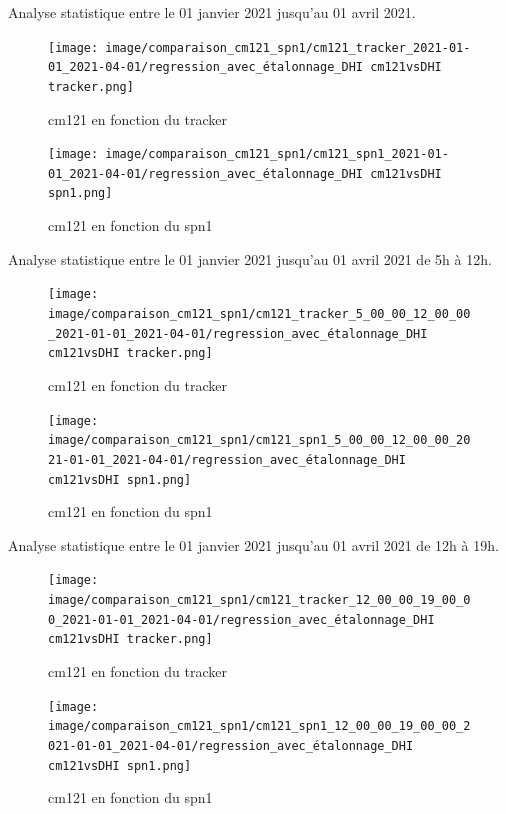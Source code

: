 \documentclass[12pt,a4paper]{article}
\begin{document}
\begin{flushleft}
Analyse statistique entre le 01 janvier 2021 jusqu'au 01 avril 2021.

\begin{figure}[H]
\centering
\texttt{[image: image/comparaison\_cm121\_spn1/cm121\_tracker\_2021-01-01\_2021-04-01/regression\_avec\_étalonnage\_DHI cm121vsDHI tracker.png]} 
\caption{cm121 en fonction du tracker}    
\end{figure}

\begin{figure}[H]
\centering
\texttt{[image: image/comparaison\_cm121\_spn1/cm121\_spn1\_2021-01-01\_2021-04-01/regression\_avec\_étalonnage\_DHI cm121vsDHI spn1.png]}  
\caption{cm121 en fonction du spn1} 
\end{figure}


Analyse statistique entre le 01 janvier 2021 jusqu'au 01 avril 2021 de 5h à 12h.

\begin{figure}[H]
\centering
\texttt{[image: image/comparaison\_cm121\_spn1/cm121\_tracker\_5\_00\_00\_12\_00\_00\_2021-01-01\_2021-04-01/regression\_avec\_étalonnage\_DHI cm121vsDHI tracker.png]}  
\caption{cm121 en fonction du tracker}
\end{figure}

\begin{figure}[H]
\centering
\texttt{[image: image/comparaison\_cm121\_spn1/cm121\_spn1\_5\_00\_00\_12\_00\_00\_2021-01-01\_2021-04-01/regression\_avec\_étalonnage\_DHI cm121vsDHI spn1.png]}  
\caption{cm121 en fonction du spn1}  
\end{figure}



Analyse statistique entre le 01 janvier 2021 jusqu'au 01 avril 2021 de 12h à 19h.


\begin{figure}[H]
\centering
\texttt{[image: image/comparaison\_cm121\_spn1/cm121\_tracker\_12\_00\_00\_19\_00\_00\_2021-01-01\_2021-04-01/regression\_avec\_étalonnage\_DHI cm121vsDHI tracker.png]} 
\caption{cm121 en fonction du tracker}    
\end{figure}

\begin{figure}[H]
\centering
\texttt{[image: image/comparaison\_cm121\_spn1/cm121\_spn1\_12\_00\_00\_19\_00\_00\_2021-01-01\_2021-04-01/regression\_avec\_étalonnage\_DHI cm121vsDHI spn1.png]}  
\caption{cm121 en fonction du spn1}   
\end{figure}




\end{flushleft}






\end{document}
